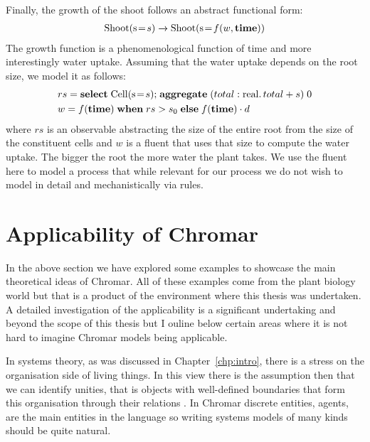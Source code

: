 Finally, the growth of the shoot follows an abstract functional form:
\begin{align*}
\mathrm{Shoot}(\mathrm{s} \! = \! {s}) \xrightarrow{} \mathrm{Shoot}(\mathrm{s} \! = \! {f(w, \mathbf{time})})
\end{align*}
The growth function is a phenomenological function of time and more
interestingly water uptake. Assuming that the water uptake depends on the root
size, we model it as follows:
\begin{align*}
& rs  = \mathbf{select} \; \mathrm{Cell}(\mathrm{s} \! = \! {s}) \mathbf{;} \; \mathbf{aggregate} \;
                                                              (total:
                                                              \mathrm{real}.\,
                                                              total + s) \; 0 \\
& w = f(\mathbf{time}) \; \mathbf{when} \; rs > s_0 \; \mathbf{else} \;
f(\mathbf{time}) \cdot d                                       
\end{align*}
where $rs$ is an observable abstracting the size of the entire root from the
size of the constituent cells and $w$ is a fluent that uses that size to compute
the water uptake. The bigger the root the more water the plant takes. We use the
fluent here to model a process that while relevant for our process we do not
wish to model in detail and mechanistically via rules.

\section{Applicability of Chromar}
In the above section we have explored some examples to showcase the main
theoretical ideas of Chromar. All of these examples come from the plant biology
world but that is a product of the environment where this thesis was
undertaken. A detailed investigation of the applicability is a significant
undertaking and beyond the scope of this thesis but I ouline below certain areas
where it is not hard to imagine Chromar models being applicable.

In systems theory, as was discussed in Chapter~\ref{chp:intro}, there is a
stress on the organisation side of living things. In this view there is the
assumption then that we can identify unities, that is objects with well-defined
boundaries that form this organisation through their relations \citep[see, for
example, Section 9 in][]{varela_autopoiesis:_1974}. In Chromar discrete
entities, agents, are the main entities in the language so writing systems
models of many kinds should be quite natural.


